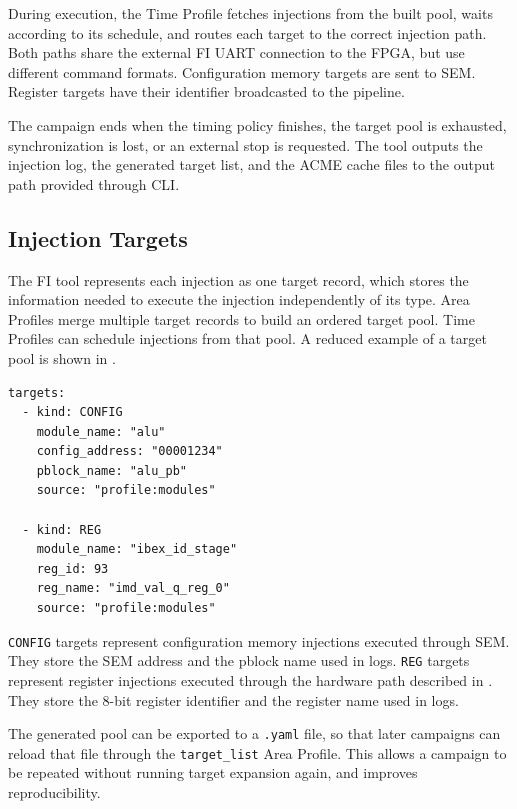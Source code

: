 During execution, the Time Profile fetches injections from the built pool, waits according to its schedule, and routes each target to the correct injection path. Both paths share the external \ac{FI} \ac{UART} connection to the \ac{FPGA}, but use different command formats. Configuration memory targets are sent to \ac{SEM}. Register targets have their identifier broadcasted to the pipeline. 

The campaign ends when the timing policy finishes, the target pool is exhausted, synchronization is lost, or an external stop is requested. The tool outputs the injection log, the generated target list, and the \ac{ACME} cache files to the output path provided through \ac{CLI}.



\subsection{Injection Targets}
\label{chap8:fi_targets_specs}

The \ac{FI} tool represents each injection as one target record, which stores the information needed to execute the injection independently of its type. Area Profiles merge multiple target records to build an ordered target pool. Time Profiles can schedule injections from that pool. A reduced example of a target pool is shown in .


\begin{lstlisting}[float=h,caption={Reduced example of a mixed target pool.},label={lst:tpool_example}]
targets:
  - kind: CONFIG
    module_name: "alu"
    config_address: "00001234"
    pblock_name: "alu_pb"
    source: "profile:modules"

  - kind: REG
    module_name: "ibex_id_stage"
    reg_id: 93
    reg_name: "imd_val_q_reg_0"
    source: "profile:modules"
\end{lstlisting}


\texttt{CONFIG} targets represent configuration memory injections executed through \ac{SEM}. They store the \ac{SEM} address and the pblock name used in logs. \texttt{REG} targets represent register injections executed through the hardware path described in . They store the 8-bit register identifier and the register name used in logs.

The generated pool can be exported to a \texttt{.yaml} file, so that later campaigns can reload that file through the \texttt{target\_list} Area Profile. This allows a campaign to be repeated without running target expansion again, and improves reproducibility. 







